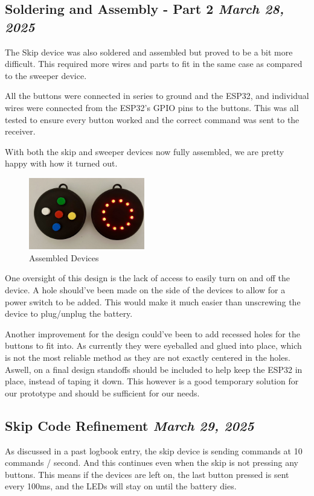 \documentclass{article}
\newcommand{\logbookentry}[2]{
    \subsection*{#1 \hfill \textit{#2}} 
}
\begin{document}
\logbookentry{Soldering and Assembly - Part 2}{March 28, 2025}
The Skip device was also soldered and assembled but proved to be a bit more difficult. This required more wires and parts to fit in the same case as compared to the sweeper device.

All the buttons were connected in series to ground and the ESP32, and individual wires were connected from the ESP32's GPIO pins to the buttons. This was all tested to ensure every button worked and the correct command was sent to the receiver. 

With both the skip and sweeper devices now fully assembled, we are pretty happy with how it turned out.

\begin{figure}[ht!]
    \centering
    \includegraphics[width=0.45\textwidth]{device_assembled.jpeg}
    \caption{Assembled Devices}
    \label{fig:assembled_devices}
\end{figure}



One oversight of this design is the lack of access to easily turn on and off the device. A hole should've been made on the side of the devices to allow for a power switch to be added. This would make it much easier than unscrewing the device to plug/unplug the battery.

Another improvement for the design could've been to add recessed holes for the buttons to fit into. As currently they were eyeballed and glued into place, which is not the most reliable method as they are not exactly centered in the holes. Aswell, on a final design standoffs should be included to help keep the ESP32 in place, instead of taping it down. This however is a good temporary solution for our prototype and should be sufficient for our needs.

\logbookentry{Skip Code Refinement}{March 29, 2025}
As discussed in a past logbook entry, the skip device is sending commands at 10 commands / second. And this continues even when the skip is not pressing any buttons. This means if the devices are left on, the last button pressed is sent every 100ms, and the LEDs will stay on until the battery dies.
\end{document}

